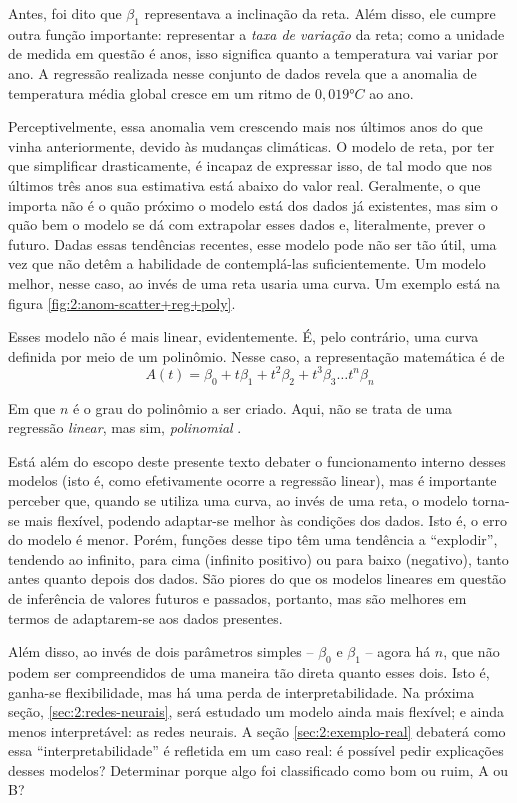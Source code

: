 Antes, foi dito que $\beta_1$ representava a inclinação da reta.
Além disso, ele cumpre outra função importante: representar a \textit{taxa de variação} da reta; como a unidade de medida em questão é anos, isso significa quanto a temperatura vai variar por ano.
A regressão realizada nesse conjunto de dados revela que a anomalia de temperatura média global cresce em um ritmo de $0,019 °C$ ao ano.

Perceptivelmente, essa anomalia vem crescendo mais nos últimos anos do que vinha anteriormente, devido às mudanças climáticas.
O modelo de reta, por ter que simplificar drasticamente, é incapaz de expressar isso, de tal modo que nos últimos três anos sua estimativa está abaixo do valor real.
Geralmente, o que importa não é o quão próximo o modelo está dos dados já existentes, mas sim o quão bem o modelo se dá com extrapolar esses dados e, literalmente, prever o futuro.
Dadas essas tendências recentes, esse modelo pode não ser tão útil, uma vez que não detêm a habilidade de contemplá-las suficientemente.
Um modelo melhor, nesse caso, ao invés de uma reta usaria uma curva.
Um exemplo está na figura \ref{fig:2:anom-scatter+reg+poly}.

Esses modelo não é mais linear, evidentemente.
É, pelo contrário, uma curva definida por meio de um polinômio.
Nesse caso, a representação matemática é de
\begin{equation}
A(t) = \beta_0 + t \beta_1 + t^2 \beta_2 + t^3 \beta_3 \dots t^n \beta_n 
\end{equation}

Em que $n$ é o grau do polinômio a ser criado.
Aqui, não se trata de uma regressão \textit{linear}, mas sim, \textit{polinomial} \cite{james_introduction_2021a}.

Está além do escopo deste presente texto debater o funcionamento interno desses modelos (isto é, como efetivamente ocorre a regressão linear), mas é importante perceber que, quando se utiliza uma curva, ao invés de uma reta, o modelo torna-se mais flexível, podendo adaptar-se melhor às condições dos dados.
Isto é, o erro do modelo é menor.
Porém, funções desse tipo têm uma tendência a ``explodir'', tendendo ao infinito, para cima (infinito positivo) ou para baixo (negativo), tanto antes quanto depois dos dados.
São piores do que os modelos lineares em questão de inferência de valores futuros e passados, portanto, mas são melhores em termos de adaptarem-se aos dados presentes.

Além disso, ao invés de dois parâmetros simples -- $\beta_0$ e $\beta_1$ -- agora há $n$, que não podem ser compreendidos de uma maneira tão direta quanto esses dois.
Isto é, ganha-se flexibilidade, mas há uma perda de interpretabilidade.
Na próxima seção, \ref{sec:2:redes-neurais}, será estudado um modelo ainda mais flexível; e ainda menos interpretável: as redes neurais.
A seção \ref{sec:2:exemplo-real} debaterá como essa ``interpretabilidade'' é refletida em um caso real: é possível pedir explicações desses modelos?
Determinar porque algo foi classificado como bom ou ruim, A ou B?

